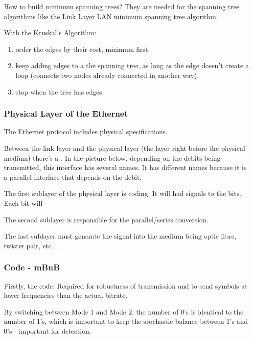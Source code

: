 \ul{How to build minimum spanning trees?}
They are needed for the spanning tree algorithms like the Link Layer LAN minimum spanning tree algorithm.

With the Kruskal's Algorithm: %
\begin{enumerate}
    \item order the edges by their cost, minimum first.
    \item keep adding edges to a the spanning tree, as long as the edge doesn't create a loop (connects two nodes already connected in another way).
    \item stop when the tree has  edges.
\end{enumerate}





\subsubsection{Physical Layer of the Ethernet}

The Ethernet protocol includes physical specifications.

Between the link layer and the physical layer (the layer right before the physical medium) there's a . In the picture below, depending on the debits being transmitted, this interface has several names. It has different names because it is a parallel interface that depends on the debit.



The first sublayer of the physical layer is coding. It will had signals to the bits. Each bit will 

The second sublayer is responsible for the parallel/series conversion.

The last sublayer must generate the signal into the medium being optic fibre, twister pair, etc...

\subsubsection*{Code - mBnB}

Firstly, the code. Required for robustness of transmission and to send symbols at lower frequencies than the actual bitrate.




By switching between Mode 1 and Mode 2, the number of 0's is identical to the number of 1's, which is important to keep the stochastic balance between 1's and 0's - important for detection.



